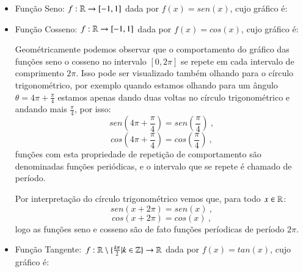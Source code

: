   \begin{itemize}
  \item Função Seno: $f: \mathbb{R} \rightarrow [-1, 1]$ dada por $f(x)= sen (x)$, cujo gráfico é:


  \item Função Cosseno: $f: \mathbb{R} \rightarrow [-1, 1]$ dada por $f(x)= cos (x)$, cujo gráfico é:

  
  Geométricamente podemos observar que o comportamento do gráfico das funções seno o cosseno no intervalo $[0, 2\pi]$ se repete em cada intervalo de comprimento $2\pi$. Isso pode ser visualizado também olhando para o círculo trigonométrico, por exemplo quando estamos olhando para um ângulo $\theta= 4\pi + \frac{\pi}{4}$ estamos apenas dando duas voltas no círculo trigonométrico e andando mais $\frac{\pi}{4}$, por isso:
  \[sen(4\pi + \frac{\pi}{4})= sen(\frac{\pi}{4}) \ ,\]
  \[cos(4\pi + \frac{\pi}{4})= cos(\frac{\pi}{4}) \ , \]
  funções com esta propriedade de repetição de comportamento são denominadas funções periódicas, e o intervalo que se repete é chamado de período.
  
  Por interpretação do círculo trigonométrico vemos que, para todo $x \in \mathbb{R}$:
  \[sen(x + 2 \pi)= sen(x) \ ,\]
  \[cos(x + 2\pi)= cos(x) \ , \]
  logo as funções seno e cosseno são de fato funções períodicas de período $2\pi$.
  
  \item Função Tangente: $f: \mathbb{R} \setminus \{\frac{k\pi}{2} | k \in \mathbb{Z}\} \rightarrow \mathbb{R}$ dada por $f(x)= tan (x)$, cujo gráfico é:


\end{itemize}
